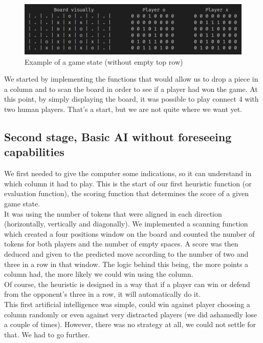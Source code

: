 \documentclass[12pt, a4paper, oneside]{report}
\begin{document}
	\begin{figure}[h]
		\includegraphics[scale=0.4]{example.png}
		\centering
		\caption{Example of a game state (without empty top row)}\label{fig:example_game_state}
	\end{figure}

	We started by implementing the functions that would allow us to drop a piece in a column and to scan the board in order to see if a player had won the game. At this point, by simply displaying the board, it was possible to play connect 4 with two human players. That’s a start, but we are not quite where we want yet. \\

	\subsection{Second stage, Basic AI without foreseeing capabilities}

	We first needed to give the computer some indications, so it can understand in which column it had to play. This is the start of our first heuristic function (or evaluation function), the scoring function that determines the score of a given game state. \\
	It was using the number of tokens that were aligned in each direction (horizontally, vertically and diagonally). We implemented a scanning function which created a four positions window on the board and counted the number of tokens for both players and the number of empty spaces. A score was then deduced and given to the predicted move according to the number of two and three in a row in that window. The logic behind this being, the more points a column had, the more likely we could win using the column. \\
	Of course, the heuristic is designed in a way that if a player can win or defend from the opponent’s three in a row, it will automatically do it. \\

	This first artificial intelligence was simple, could win against player choosing a column randomly or even against very distracted players (we did ashamedly lose a couple of times). However, there was no strategy at all, we could not settle for that. We had to go further. \\
\end{document}
